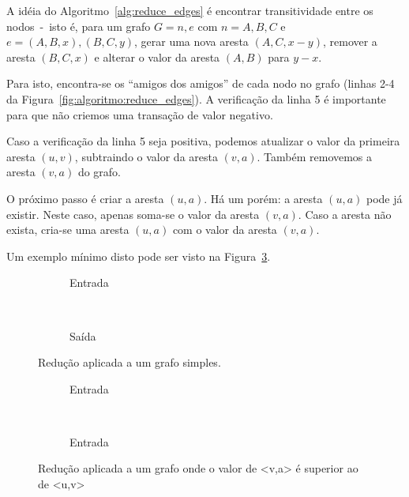 \documentclass[12pt]{article}
\begin{document}
A idéia do Algoritmo~\ref{alg:reduce_edges} é encontrar transitividade entre os
nodos~-~isto é, para um grafo $G = {n, e}$ com $n = {A, B, C}$ e $e = {(A, B, x),
  (B, C, y)}$, gerar uma nova aresta $(A, C, x - y)$, remover a aresta $(B, C,
x)$ e alterar o valor da aresta $(A, B)$ para $y - x$.

Para isto, encontra-se os ``amigos dos amigos'' de cada nodo no grafo (linhas
2-4 da Figura~\ref{fig:algoritmo:reduce_edges}). A verificação da linha 5 é
importante para que não criemos uma transação de valor negativo.

Caso a verificação da linha 5 seja positiva, podemos atualizar o valor da
primeira aresta $(u, v)$, subtraindo o valor da aresta $(v, a)$. Também
removemos a aresta $(v, a)$ do grafo.

O próximo passo é criar a aresta $(u, a)$. Há um porém: a aresta $(u, a)$ pode
já existir. Neste caso, apenas soma-se o valor da aresta $(v, a)$. Caso a aresta
não exista, cria-se uma aresta $(u, a)$ com o valor da aresta $(v, a)$.

Um exemplo mínimo disto pode ser visto na Figura~\ref{fig:reduce:abc}.

\begin{figure}[H]
  \centering
  \begin{subfigure}[b]{0.5\textwidth}
    \begin{dot2tex}[neato,options=-tmath]
        
    \end{dot2tex}
    \caption{Entrada}
    \label{fig:reduce:abc:entrada}
  \end{subfigure}%
  ~
  \begin{subfigure}[b]{0.5\textwidth}
    \begin{dot2tex}[neato,options=-tmath]
        
    \end{dot2tex}
    \caption{Saída}
    \label{fig:reduce:abc:saida}
  \end{subfigure}
  \caption{Redução aplicada a um grafo simples.}
  \label{fig:reduce:abc}
\end{figure}

\begin{figure}[H]
  \centering
  \begin{subfigure}[b]{0.5\textwidth}
    \begin{dot2tex}[neato,options=-tmath]
      
    \end{dot2tex}
    \caption{Entrada}
    \label{fig:reduce:uva:entrada}
  \end{subfigure}%
  ~
  \begin{subfigure}[b]{0.5\textwidth}
    \begin{dot2tex}[neato,options=-tmath]
      
    \end{dot2tex}
    \caption{Entrada}
    \label{fig:reduce:uva:saida}
  \end{subfigure}
  \caption{Redução aplicada a um grafo onde o valor de <v,a> é superior ao de
    <u,v>}
  \label{fig:reduce:uva}
\end{figure}
\end{document}
